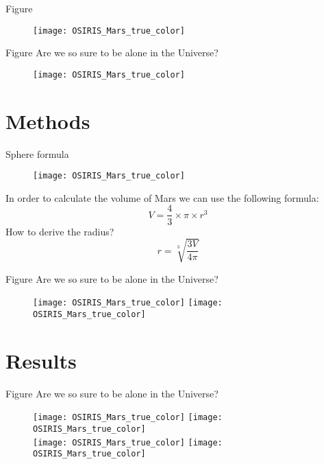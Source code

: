 \documentclass{beamer}
\begin{document}
\begin{frame}{Figure}
    \begin{figure}
        \centering
        \texttt{[image: OSIRIS\_Mars\_true\_color]}
    \end{figure}
\end{frame}

\begin{frame}{Figure}
Are we so sure to be alone in the Universe?
    \begin{figure}
        \centering
        \texttt{[image: OSIRIS\_Mars\_true\_color]}
    \end{figure}
\end{frame}

\section{Methods}

\begin{frame}{Sphere formula}
   \begin{figure}
        \centering
        \texttt{[image: OSIRIS\_Mars\_true\_color]}
    \end{figure}
    In order to calculate the volume of Mars we can use the following formula:
    \begin{equation}
        V=\frac{4}{3} \times \pi \times r^3
    \end{equation}
    How to derive the radius?
    \begin{equation}
        r=\sqrt[3]{\frac{3V}{4\pi}}
    \end{equation}
\end{frame}

\begin{frame}{Figure}
Are we so sure to be alone in the Universe?
    \begin{figure}
        \centering
        \texttt{[image: OSIRIS\_Mars\_true\_color]}
        \texttt{[image: OSIRIS\_Mars\_true\_color]}
    \end{figure}
\end{frame}

\section{Results}

\begin{frame}{Figure}
Are we so sure to be alone in the Universe?
    \begin{figure}
        \centering
        \texttt{[image: OSIRIS\_Mars\_true\_color]}
        \texttt{[image: OSIRIS\_Mars\_true\_color]} \\
        \texttt{[image: OSIRIS\_Mars\_true\_color]}
        \texttt{[image: OSIRIS\_Mars\_true\_color]}        
    \end{figure}
\end{frame}
\end{document}
